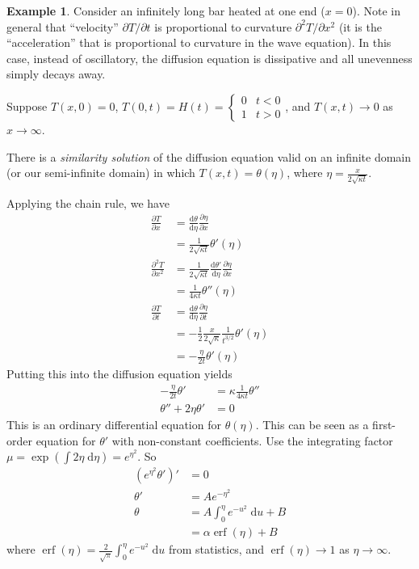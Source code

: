 \documentclass[a4paper]{article}
\theoremstyle{definition}
\newtheorem*{eg}{Example}
\renewcommand{\d}{\mathrm{d}}
\DeclareMathOperator\erf{erf}
\begin{document}
\begin{eg}
  Consider an infinitely long bar heated at one end ($x = 0$). Note in general that ``velocity'' $\partial T/\partial t$ is proportional to curvature $\partial^2 T/\partial x^2$ (it is the ``acceleration'' that is proportional to curvature in the wave equation). In this case, instead of oscillatory, the diffusion equation is dissipative and all unevenness simply decays away.

Suppose $T(x,0) = 0$, $T(0, t) = H(t) = 
\begin{cases}
  0 & t < 0\\
  1 & t > 0
\end{cases}$, and $T(x, t)\to 0$ as $x\to \infty$.

There is a \emph{similarity solution} of the diffusion equation valid on an infinite domain (or our semi-infinite domain) in which $T(x, t) = \theta(\eta)$, where $\displaystyle \eta = \frac{x}{2\sqrt{\kappa t}}$.

Applying the chain rule, we have
\begin{align*}
  \frac{\partial T}{\partial x} &= \frac{\d \theta}{\d \eta} \frac{\partial \eta}{\partial x}\\
  &= \frac{1}{2\sqrt{\kappa t}} \theta'(\eta)\\
  \frac{\partial^2 T}{\partial x^2} &= \frac{1}{2\sqrt{\kappa t}} \frac{\d\theta'}{\d\eta}\frac{\partial \eta}{\partial x}\\
  &= \frac{1}{4\kappa t}\theta''(\eta)\\
  \frac{\partial T}{\partial t} &= \frac{\d \theta}{\d \eta}\frac{\partial \eta}{\partial t}\\
  &= -\frac{1}{2}\frac{x}{2\sqrt{\kappa}}\frac{1}{t^{3/2}} \theta'(\eta)\\
  &= -\frac{\eta}{2t}\theta'(\eta)
\end{align*}
Putting this into the diffusion equation yields
\begin{align*}
  -\frac{\eta}{2t}\theta' &= \kappa \frac{1}{4\kappa t}\theta''\\
  \theta'' + 2\eta\theta' &= 0
\end{align*}
This is an ordinary differential equation for $\theta(\eta)$. This can be seen as a first-order equation for $\theta'$ with non-constant coefficients. Use the integrating factor $\mu = \exp(\int 2\eta \;\d \eta) = e^{\eta^2}$. So
\begin{align*}
  (e^{\eta^2}\theta')' &= 0\\
  \theta' &= Ae^{-\eta^2}\\
  \theta &= A\int_0^\eta e^{-u^2}\;\d u + B\\
  &= \alpha\erf(\eta) + B
\end{align*}
where $\erf(\eta) = \frac{2}{\sqrt{\pi}} \int_0^\eta e^{-u^2}\;\d u$ from statistics, and $\erf(\eta)\to 1$ as $\eta\to \infty$.


\end{eg}
\end{document}
